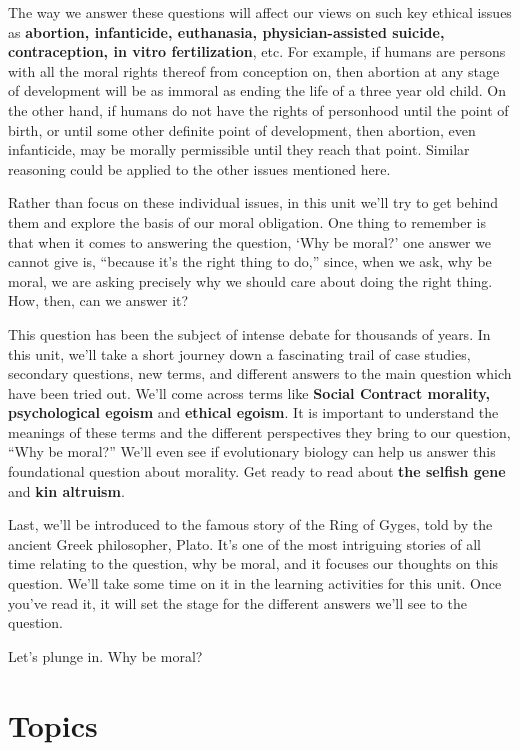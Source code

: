\documentclass[
]{book}
\begin{document}
The way we answer these questions will affect our views on such key ethical issues as \textbf{abortion, infanticide, euthanasia, physician-assisted suicide, contraception, in vitro fertilization}, etc. For example, if humans are persons with all the moral rights thereof from conception on, then abortion at any stage of development will be as immoral as ending the life of a three year old child. On the other hand, if humans do not have the rights of personhood until the point of birth, or until some other definite point of development, then abortion, even infanticide, may be morally permissible until they reach that point. Similar reasoning could be applied to the other issues mentioned here.

Rather than focus on these individual issues, in this unit we'll try to
get behind them and explore the basis of our moral obligation. One thing to
remember is that when it comes to answering the question, `Why be moral?' one
answer we cannot give is, ``because it's the right thing to do,'' since, when we
ask, why be moral, we are asking precisely why we should care about doing the
right thing. How, then, can we answer it?

This question has been the subject of intense debate for thousands of years. In this unit, we'll take a short journey down a fascinating trail of case studies, secondary questions, new terms, and different answers to the main question which have been tried out. We'll come across terms like \textbf{Social Contract morality, psychological egoism} and \textbf{ethical egoism}. It is important to understand the meanings of these terms and the different perspectives they bring to our question, ``Why be moral?'' We'll even see if evolutionary biology can help us answer this foundational question about morality. Get ready to read about \textbf{the selfish gene} and \textbf{kin altruism}.

Last, we'll be introduced to the famous story of the Ring of Gyges, told by the ancient Greek philosopher, Plato. It's one of the most intriguing stories of all time relating to the question, why be moral, and it focuses our thoughts on this question. We'll take some time on it in the learning activities for this unit. Once you've read it, it will set the stage for the different answers we'll see to the question.

Let's plunge in. Why be moral?

\hypertarget{topics-2}{%
\section*{Topics}\label{topics-2}}
\end{document}
